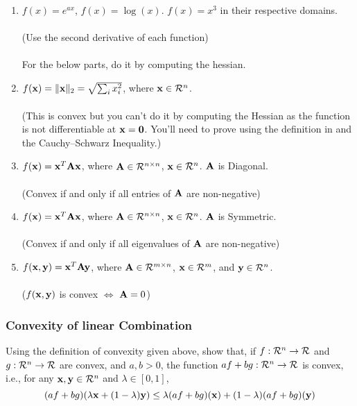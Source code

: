 \begin{enumerate}
    \item \( f(x) = e^{ax} \), \( f(x) = \log(x) \). \( f(x) = x^3\) in their respective domains.\\\\
        (Use the second derivative of each function)\\\\
      For the below parts, do it by computing the hessian.
        
    \item \( f(\mathbf{x}) = \|\mathbf{x}\|_2 = \sqrt{\sum_{i} x_i^2} \), where \( \mathbf{x}  \in \mathcal{R}^n\).\\\\
    (This is convex but you can't do it by computing the Hessian as the function is not differentiable at $\mathbf{x} = \mathbf{0}$. You'll need to prove using the definition in  and the Cauchy–Schwarz Inequality.)


  \item \( f(\mathbf{x}) = \mathbf{x}^T \mathbf{A} \mathbf{x} \), where \( \mathbf{A} \in \mathcal{R}^{n \times n} \), \( \mathbf{x} \in \mathcal{R}^n \). $\mathbf{A}$ is Diagonal. \\\\
   (Convex if and only if all entries of $\mathbf{A}$ are non-negative)


    \item \( f(\mathbf{x}) = \mathbf{x}^T \mathbf{A} \mathbf{x} \), where \( \mathbf{A} \in \mathcal{R}^{n \times n} \), \( \mathbf{x} \in \mathcal{R}^n \). $\mathbf{A}$ is Symmetric. \\\\
    (Convex if and only if all eigenvalues of $\mathbf{A}$ are non-negative)

    \item \( f(\mathbf{x}, \mathbf{y}) = \mathbf{x}^T \mathbf{A} \mathbf{y} \), where \( \mathbf{A} \in \mathcal{R}^{m \times n} \), \( \mathbf{x} \in \mathcal{R}^m \), and \( \mathbf{y} \in \mathcal{R}^n \).\\\\
    ($f(\mathbf{x}, \mathbf{y})$ is convex $\iff$ $\mathbf{A} = 0$)

    \end{enumerate}
\subsubsection{Convexity of linear Combination}\label{theorem:sum_convex}
Using the definition of convexity given above, show that, if $f: \mathcal{R}^n \to \mathcal{R}$ and $g: \mathcal{R}^n \to \mathcal{R}$ are convex, and $a, b > 0$, the function $a f + bg : \mathcal{R}^n \to \mathcal{R}$ is convex, i.e., for any $\mathbf{x}, \mathbf{y} \in \mathcal{R}^n$ and $\lambda \in [0, 1]$,
\begin{equation*}
    (a f + bg)(\lambda \mathbf{x} + (1 - \lambda)\mathbf{y}) \leq \lambda (a f + bg)(\mathbf{x}) + (1 - \lambda) (a f + bg)(\mathbf{y})
\end{equation*}

